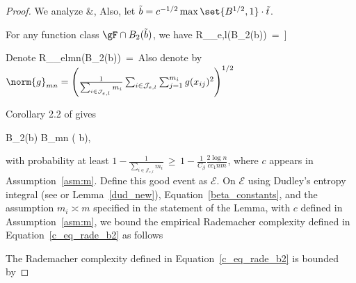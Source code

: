 \documentclass[twoside,11pt]{article}
\begin{document}
\begin{proof}

We analyze   
\bea 
&, 
\bea 
Also, let $\tilde b = c^{-1/2}\max\set{B^{1/2},1}\cdot \tilde t$.



For any function class $\gF \cap B_2(\tilde b)$, we have 
\bea 
R_{_{e,l}}\left(\gF \cap B_2(\tilde b)\right) \,=\, \E\Big[\mathbb{E} \Big[  \sup_{g \in \gF \cap B_2(b)} 
\frac{1}{\sum_{i \in \mathcal{J}_{e,l}}  m_i}\sum_{i \in \mathcal{J}_{e,l}} \sum_{j=1}^{m_{i}}s_{ij}  g(x_{ij}) |\set{x_{ij}} \Big]\Big] 
\bea 

Denote 
\beq 
\label{c_eq_rade_b2}
R_{_{elmn}}\left(\gF \cap B_2(\tilde b)\right) \,=\,  \left[  \sup_{g \in \gF \cap B_2(\tilde b)} 
\frac{1}{\sum_{i \in \mathcal{J}_{e,l}}  m_i}\sum_{i \in \mathcal{J}_{e,l}} \sum_{j=1}^{m_{i}}s_{ij}  g(x_{ij}) |\set{x_{ij}} \right]
\beq 
Also denote by $\norm{g}_{mn} = \left(\frac{1}{\sum_{i \in \mathcal{J}_{e,l}}  m_i}\sum_{i \in \mathcal{J}_{e,l}} \sum_{j=1}^{m_{i}} g(x_{ij})^2\right)^{1/2}$




Corollary 2.2 of \cite{bartlett2005local} gives

\bea
\gF \cap B_2(\tilde b) \subseteq \gF \cap B_{mn} ( \tilde b),
\bea

with probability at least $1 - \frac{1}{\sum_{i \in \mathcal{J}_{e,l}}m_i} \,\geq\, 1 - \frac{1}{C_{\beta}}\frac{2\log n}{cc_1nm}$, where $c$ appears in Assumption~\ref{asm:m}. Define this good event as $\mathcal{E}$. On $\mathcal{E}$ using Dudley’s entropy integral (see \cite{dudley1967sizes} or Lemma~\ref{dud_new}), Equation~\eqref{beta_constants}, and the assumption $m_i \asymp m$ specified in the statement of the Lemma, with $c$ defined in Assumption~\ref{asm:m}, we bound the empirical Rademacher complexity defined in Equation~\eqref{c_eq_rade_b2} as follows


The Rademacher complexity defined in Equation~\eqref{c_eq_rade_b2} is bounded by



\end{proof}
\end{document}
